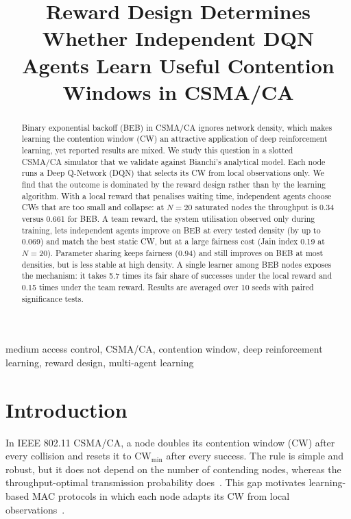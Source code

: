 \documentclass[conference]{IEEEtran}
\begin{document}
\title{Reward Design Determines Whether Independent DQN Agents Learn Useful Contention Windows in CSMA/CA}

\author{
}
\maketitle

\begin{abstract}
Binary exponential backoff (BEB) in CSMA/CA ignores network density, which makes learning the contention window (CW) an attractive application of deep reinforcement learning, yet reported results are mixed. We study this question in a slotted CSMA/CA simulator that we validate against Bianchi's analytical model. Each node runs a Deep Q-Network (DQN) that selects its CW from local observations only. We find that the outcome is dominated by the reward design rather than by the learning algorithm. With a local reward that penalises waiting time, independent agents choose CWs that are too small and collapse: at $N{=}20$ saturated nodes the throughput is 0.34 versus 0.661 for BEB. A team reward, the system utilisation observed only during training, lets independent agents improve on BEB at every tested density (by up to 0.069) and match the best static CW, but at a large fairness cost (Jain index 0.19 at $N{=}20$). Parameter sharing keeps fairness (0.94) and still improves on BEB at most densities, but is less stable at high density. A single learner among BEB nodes exposes the mechanism: it takes 5.7 times its fair share of successes under the local reward and 0.15 times under the team reward. Results are averaged over 10 seeds with paired significance tests.
\end{abstract}

\begin{IEEEkeywords}
medium access control, CSMA/CA, contention window, deep reinforcement learning, reward design, multi-agent learning
\end{IEEEkeywords}

\section{Introduction}
In IEEE 802.11 CSMA/CA, a node doubles its contention window (CW) after every collision and resets it to $\mathrm{CW}_{\min}$ after every success. The rule is simple and robust, but it does not depend on the number of contending nodes, whereas the throughput-optimal transmission probability does~\cite{bianchi2000}. This gap motivates learning-based MAC protocols in which each node adapts its CW from local observations~\cite{amuru2015,wydmanski2021,yu2019}.
\end{document}
